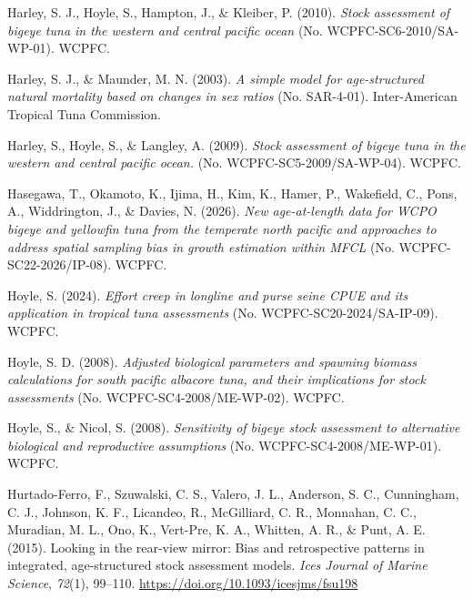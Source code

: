 \documentclass[
  english,
  a4paper,
  a4paper,
  11pt]{SCreport}
\newlength{\cslhangindent}
\newenvironment{CSLReferences}[2] %
 {\begin{list}{}{%
  \setlength{\itemindent}{0pt}
  \setlength{\leftmargin}{0pt}
  \setlength{\parsep}{0pt}
  \ifodd #1
   \setlength{\leftmargin}{\cslhangindent}
   \setlength{\itemindent}{-1\cslhangindent}
  \fi
  \setlength{\itemsep}{#2\baselineskip}}}
 {\end{list}}
\begin{document}
\begin{CSLReferences}{1}{0}
Harley, S. J., Hoyle, S., Hampton, J., \& Kleiber, P. (2010).
\emph{Stock assessment of bigeye tuna in the western and central pacific
ocean} (No. {WCPFC}-{SC}6-2010/{SA}-{WP}-01). WCPFC.

Harley, S. J., \& Maunder, M. N. (2003). \emph{A simple model for
age-structured natural mortality based on changes in sex ratios} (No.
{SAR}-4-01). Inter-American Tropical Tuna Commission.

Harley, S., Hoyle, S., \& Langley, A. (2009). \emph{Stock assessment of
bigeye tuna in the western and central pacific ocean.} (No.
{WCPFC}-{SC}5-2009/{SA}-{WP}-04). WCPFC.

Hasegawa, T., Okamoto, K., Ijima, H., Kim, K., Hamer, P., Wakefield, C.,
Pons, A., Widdrington, J., \& Davies, N. (2026). \emph{New age-at-length
data for {WCPO} bigeye and yellowfin tuna from the temperate north
pacific and approaches to address spatial sampling bias in growth
estimation within {MFCL}} (No. {WCPFC}-{SC}22-2026/{IP}-08). WCPFC.

Hoyle, S. (2024). \emph{Effort creep in longline and purse seine {CPUE}
and its application in tropical tuna assessments} (No.
{WCPFC}-{SC}20-2024/{SA}-{IP}-09). WCPFC.

Hoyle, S. D. (2008). \emph{Adjusted biological parameters and spawning
biomass calculations for south pacific albacore tuna, and their
implications for stock assessments} (No.
{WCPFC}-{SC}4-2008/{ME}-{WP}-02). WCPFC.

Hoyle, S., \& Nicol, S. (2008). \emph{Sensitivity of bigeye stock
assessment to alternative biological and reproductive assumptions} (No.
{WCPFC}-{SC}4-2008/{ME}-{WP}-01). WCPFC.

Hurtado-Ferro, F., Szuwalski, C. S., Valero, J. L., Anderson, S. C.,
Cunningham, C. J., Johnson, K. F., Licandeo, R., McGilliard, C. R.,
Monnahan, C. C., Muradian, M. L., Ono, K., Vert-Pre, K. A., Whitten, A.
R., \& Punt, A. E. (2015). Looking in the rear-view mirror: Bias and
retrospective patterns in integrated, age-structured stock assessment
models. \emph{Ices Journal of Marine Science}, \emph{72}(1), 99--110.
\url{https://doi.org/10.1093/icesjms/fsu198}


\end{CSLReferences}
\end{document}
